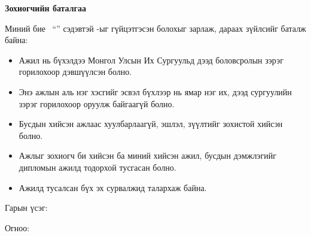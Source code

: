\makefrontpage
\maketitle

\doublespace

\markboth{}{}
\pagestyle{plain}

\begin{huge}
\textbf{Зохиогчийн баталгаа}
\end{huge}
\par\vspace{\baselineskip}
\doublespace
\noindent
Миний бие \thesisAuthor\ ``\textbf{\thesisTitle}'' сэдэвтэй
\textbf{\thesisDegreeName}-ыг гүйцэтгэсэн болохыг зарлаж,
дараах зүйлсийг баталж байна:
\begin{itemize}
\item Ажил нь бүхэлдээ Монгол Улсын Их Сургуульд дээд боловсролын зэрэг горилохоор дэвшүүлсэн болно.
\item Энэ ажлын аль нэг хэсгийг эсвэл бүхлээр нь ямар нэг их, дээд сургуулийн зэрэг горилохоор оруулж байгаагүй болно.
\item Бусдын хийсэн ажлаас хуулбарлаагүй, эшлэл, зүүлтийг зохистой хийсэн болно.
\item Ажлыг зохиогч би хийсэн ба миний хийсэн ажил, бусдын дэмжлэгийг дипломын ажилд тодорхой тусгасан болно. 
\item Ажилд тусалсан бүх эх сурвалжид талархаж байна. 
\end{itemize} 
\par

Гарын үсэг: \underline{\hspace{5cm}} 

Огноо: 	\ \ \underline{\hspace{3cm}}

\setcounter{tocdepth}{1}
\tableofcontents

\listoffigures

\listoftables

\lstlistoflistings

\clearpage
\markboth{}{}
\pagestyle{plain}


\renewcommand{\cftlabel}{Зураг}


\doublespace
{}

